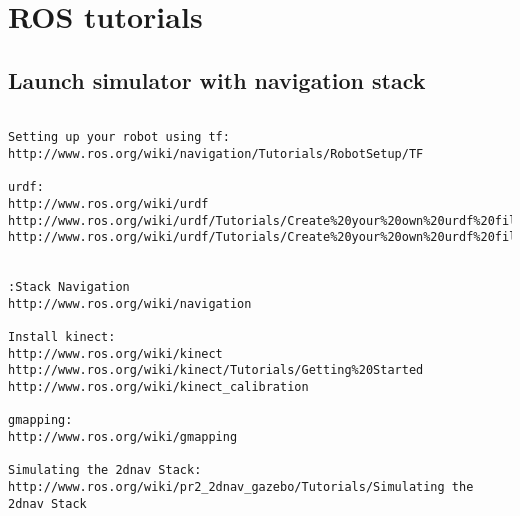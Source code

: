 \chapter{ROS tutorials}

\section{Launch simulator with navigation stack}

\begin{verbatim}

Setting up your robot using tf:
http://www.ros.org/wiki/navigation/Tutorials/RobotSetup/TF

urdf:
http://www.ros.org/wiki/urdf
http://www.ros.org/wiki/urdf/Tutorials/Create%20your%20own%20urdf%20file
http://www.ros.org/wiki/urdf/Tutorials/Create%20your%20own%20urdf%20file


:Stack Navigation
http://www.ros.org/wiki/navigation

Install kinect:
http://www.ros.org/wiki/kinect
http://www.ros.org/wiki/kinect/Tutorials/Getting%20Started
http://www.ros.org/wiki/kinect_calibration

gmapping:
http://www.ros.org/wiki/gmapping

Simulating the 2dnav Stack:
http://www.ros.org/wiki/pr2_2dnav_gazebo/Tutorials/Simulating the 2dnav Stack
\end{verbatim}
